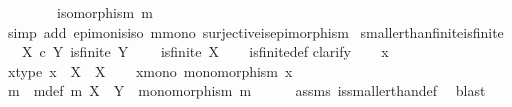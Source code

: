 \begin{isabellebody}
\ \ \isamarkupfalse%
\isanewline
\ \ \isamarkupfalse%
\ \isamarkupfalse%
\ {\isachardoublequoteopen}isomorphism\ m{\isachardoublequoteclose}\isanewline
\ \ \ \ \isamarkupfalse%
\ {\isacharparenleft}{\kern0pt}simp\ add{\isacharcolon}{\kern0pt}\ epi{\isacharunderscore}{\kern0pt}mon{\isacharunderscore}{\kern0pt}is{\isacharunderscore}{\kern0pt}iso\ m{\isacharunderscore}{\kern0pt}mono\ surjective{\isacharunderscore}{\kern0pt}is{\isacharunderscore}{\kern0pt}epimorphism{\isacharparenright}{\kern0pt}\isanewline
{}\isamarkupfalse%
%
\endisatagproof
{\isafoldproof}%
%
\isadelimproof
\isanewline
%
\endisadelimproof
\isanewline
{}\isamarkupfalse%
\ smaller{\isacharunderscore}{\kern0pt}than{\isacharunderscore}{\kern0pt}finite{\isacharunderscore}{\kern0pt}is{\isacharunderscore}{\kern0pt}finite{\isacharcolon}{\kern0pt}\isanewline
\ \ \ {\isachardoublequoteopen}X\ {\isasymle}\isactrlsub c\ Y{\isachardoublequoteclose}\ {\isachardoublequoteopen}is{\isacharunderscore}{\kern0pt}finite\ Y{\isachardoublequoteclose}\ \isanewline
\ \ \ {\isachardoublequoteopen}is{\isacharunderscore}{\kern0pt}finite\ X{\isachardoublequoteclose}\isanewline
%
\isadelimproof
\ \ %
\endisadelimproof
%
\isatagproof
{}\isamarkupfalse%
\ is{\isacharunderscore}{\kern0pt}finite{\isacharunderscore}{\kern0pt}def\isanewline
{}\isamarkupfalse%
{\isacharparenleft}{\kern0pt}clarify{\isacharparenright}{\kern0pt}\isanewline
\ \ \isamarkupfalse%
\ x\isanewline
\ \ \isamarkupfalse%
\ x{\isacharunderscore}{\kern0pt}type{\isacharcolon}{\kern0pt}\ {\isachardoublequoteopen}x\ {\isacharcolon}{\kern0pt}\ X\ {\isasymrightarrow}\ X{\isachardoublequoteclose}\isanewline
\ \ \isamarkupfalse%
\ x{\isacharunderscore}{\kern0pt}mono{\isacharcolon}{\kern0pt}\ {\isachardoublequoteopen}monomorphism\ x{\isachardoublequoteclose}\isanewline
\isanewline
\ \ \isamarkupfalse%
\ m\ \ m{\isacharunderscore}{\kern0pt}def{\isacharcolon}{\kern0pt}\ {\isachardoublequoteopen}m{\isacharcolon}{\kern0pt}\ X\ {\isasymrightarrow}\ Y\ {\isasymand}\ monomorphism\ m{\isachardoublequoteclose}\isanewline
\ \ \ \ \isamarkupfalse%
\ assms{\isacharparenleft}{\kern0pt}{}{\isacharparenright}{\kern0pt}\ is{\isacharunderscore}{\kern0pt}smaller{\isacharunderscore}{\kern0pt}than{\isacharunderscore}{\kern0pt}def\ \isamarkupfalse%
\ blast\isanewline
\ \ \isamarkupfalse%

\end{isabellebody}
